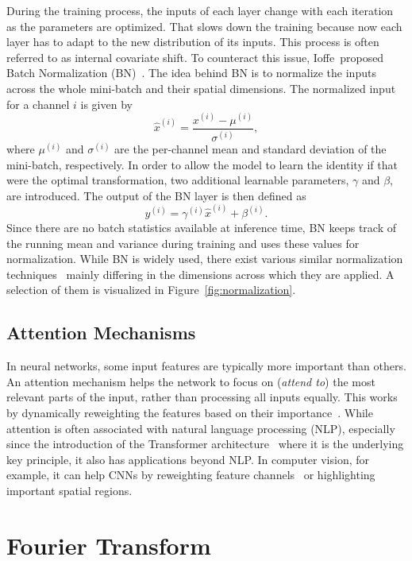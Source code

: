 During the training process, the inputs of each layer change with each iteration as the parameters are optimized.
That slows down the training because now each layer has to adapt to the new distribution of its inputs. This process is
often referred to as internal covariate shift.
To counteract this issue, Ioffe~\etal proposed Batch Normalization (BN)~\cite{BatchNorm}.
The idea behind BN is to normalize the inputs across the whole mini-batch and their spatial dimensions.
The normalized input for a channel $i$ is given by
\begin{equation}
    \hat{x}^{(i)} = \frac{x^{(i)} - \mu^{(i)}}{\sigma^{(i)}},
\end{equation} 
where $\mu^{(i)}$ and $\sigma^{(i)}$ are the per-channel mean and standard deviation of the mini-batch, respectively.  
In order to allow the model to learn the identity if that were the optimal transformation, two additional learnable
parameters, $\gamma$ and $\beta$, are introduced. The output of the BN layer is then defined as
\begin{equation}
    y^{(i)} = \gamma^{(i)}\hat{x}^{(i)} + \beta^{(i)}.
\end{equation}
Since there are no batch statistics available at inference time, BN keeps track of the running mean and variance during
training and uses these values for normalization.
While BN is widely used, there exist various similar normalization techniques~\cite{LayerNorm, InstanceNorm, GroupNorm}
mainly differing in the dimensions across which they are applied.
A selection of them is visualized in Figure~\ref{fig:normalization}.


\subsection{Attention Mechanisms}

In neural networks, some input features are typically more important than others.
An attention mechanism helps the network to focus on (\textit{attend to}) the most relevant parts of the
input, rather than processing all inputs equally.
This works by dynamically reweighting the features based on their importance~\cite{Attention}.
While attention is often associated with natural language processing (NLP), especially since the introduction of the
Transformer architecture~\cite{Transformer} where it is the underlying key principle, it also has applications beyond
NLP.\@
In computer vision, for example, it can help CNNs by reweighting feature channels~\cite{SqueezeExcite} or
highlighting important spatial regions.

\section{Fourier Transform}
